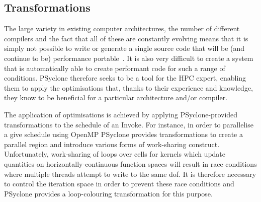 \documentclass[times]{elsarticle}
\begin{document}
\subsection{Transformations}

The large variety in existing computer architectures, the number of
different compilers and the fact that all of these are constantly
evolving means that it is simply not possible to write or generate a
single source code that will be (and continue to be) performance
portable~\cite{shallow_psykal, nemolite2d_psykal}.  It is also very
difficult to create a system that is automatically able to create
performant code for such a range of conditions. PSyclone therefore
seeks to be a tool for the HPC expert, enabling them to apply the
optimisations that, thanks to their experience and knowledge, they
know to be beneficial for a particular architecture and/or compiler.

The application of optimisations is achieved by applying
PSyclone-provided transformations to the schedule of an Invoke.  For
instance, in order to parallelise a give schedule using OpenMP
PSyclone provides transformations to create a parallel region and
introduce various forms of work-sharing construct. Unfortunately,
work-sharing of loops over cells for kernels which update quantities
on horizontally-continuous function spaces will result in race
conditions where multiple threads attempt to write to the same dof. It
is therefore necessary to control the iteration space in order to
prevent these race conditions and PSyclone provides a loop-colouring
transformation for this purpose.
\end{document}
